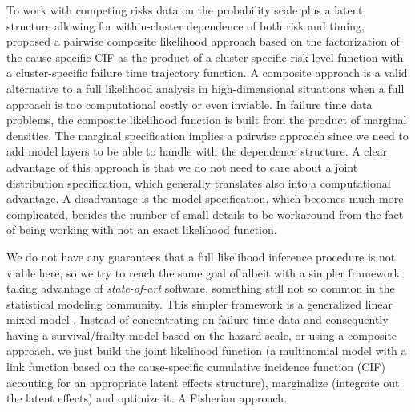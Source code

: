 To work with competing risks data on the probability scale plus a latent
structure allowing for within-cluster dependence of both risk and
timing,  proposed a pairwise composite likelihood
approach based on the factorization of the cause-specific CIF as the
product of a cluster-specific risk level function with a
cluster-specific failure time trajectory function. A composite approach
\cite{lindsay88, cox&reid04, varin11} is a valid alternative to a full
likelihood analysis in high-dimensional situations when a full approach
is too computational costly or even inviable. In failure time data
problems, the composite likelihood function is built from the product of
marginal densities. The marginal specification implies a pairwise
approach since we need to add model layers to be able to handle with the
dependence structure. A clear advantage of this approach is that we do
not need to care about a joint distribution specification, which
generally translates also into a computational advantage. A disadvantage
is the model specification, which becomes much more complicated, besides
the number of small details to be workaround from the fact of being
working with not an exact likelihood function.

We do not have any guarantees that a full likelihood inference procedure
is not viable here, so we try to reach the same goal of
 albeit with a simpler framework taking advantage of
\textit{state-of-art} software, something still not so common in the
statistical modeling community. This simpler framework is a generalized
linear mixed model \cite[GLMM]{GLMM}. Instead of concentrating on
failure time data and consequently having a survival/frailty model based
on the hazard scale, or using a composite approach, we just build the
joint likelihood function (a multinomial model with a link function
based on the cause-specific cumulative incidence function (CIF)
accouting for an appropriate latent effects structure), marginalize
(integrate out the latent effects) and optimize it. A Fisherian
approach.

